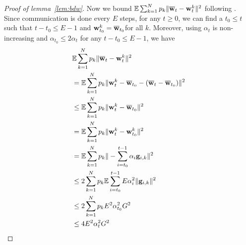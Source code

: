 \begin{proof}[Proof of lemma~\ref{lem:bdw}]
	Now we bound $\mathbb{E}\sum_{k=1}^{N}p_{k}\|{\overline{\mathbf{w}}}_{t}-{\mathbf{w}}_{t}^{k}\|^{2}$ following \cite{li2019convergence}.
	Since communication is done every $E$ steps, for any $t\geq0$, we
	can find a $t_{0}\leq t$ such that $t-t_{0}\leq E-1$ and ${\mathbf{w}}_{t_{0}}^{k}={\overline{\mathbf{w}}}_{t_{0}}$for
	all $k$. Moreover, using $\alpha_{t}$ is non-increasing and $\alpha_{t_{0}}\leq2\alpha{}_{t}$
	for any $t-t_{0}\leq E-1$, we have 
		\begin{align*}
	& \mathbb{E}\sum_{k=1}^{N}p_{k}\|{\overline{\mathbf{w}}}_{t}-{\mathbf{w}}_{t}^{k}\|^{2}\\
	& =\mathbb{E}\sum_{k=1}^{N}p_{k}\|{\mathbf{w}}_{t}^{k}-{\overline{\mathbf{w}}}_{t_{0}}-({\overline{\mathbf{w}}}_{t}-{\overline{\mathbf{w}}}_{t_{0}})\|^{2}\\
	& \leq\mathbb{E}\sum_{k=1}^{N}p_{k}\|{\mathbf{w}}_{t}^{k}-{\overline{\mathbf{w}}}_{t_{0}}\|^{2}\\
	& =\mathbb{E}\sum_{k=1}^{N}p_{k}\|{\mathbf{w}}_{t}^{k}-{\mathbf{w}}_{t_{0}}^{k}\|^{2}\\
	& =\mathbb{E}\sum_{k=1}^{N}p_{k}\|-\sum_{i=t_{0}}^{t-1}\alpha_{i}{\mathbf{g}}_{i,k}\|^{2}\\
	& \leq2\sum_{k=1}^{N}p_{k}\mathbb{E}\sum_{i=t_{0}}^{t-1}E\alpha_{i}^{2}\|{\mathbf{g}}_{i,k}\|^{2}\\
	& \leq2\sum_{k=1}^{N}p_{k}E^{2}\alpha_{t_{0}}^{2}G^{2}\\
	& \leq4E^{2}\alpha_{t}^{2}G^{2}
	\end{align*}
\end{proof}

